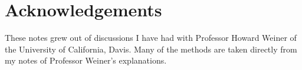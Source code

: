 \section{Acknowledgements}

These notes grew out of discussions I have had with Professor Howard Weiner of the University of California, Davis. Many of the methods are taken directly from my notes of Professor Weiner's explanations. 